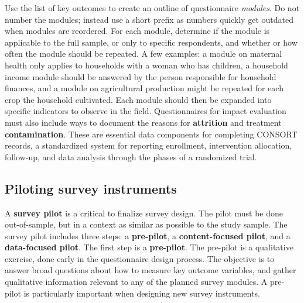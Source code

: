 Use the list of key outcomes to create an outline of questionnaire \textit{modules}.
Do not number the modules; instead use a short prefix
as numbers quickly get outdated when modules are reordered.
For each module, determine if the module is applicable to the full sample,
or only to specific respondents,
and whether or how often the module should be repeated.
A few examples:
a module on maternal health only applies
to households with a woman who has children,
a household income module should be answered
by the person responsible for household finances,
and a module on agricultural production
might be repeated for each crop the household cultivated.
Each module should then be expanded
into specific indicators to observe in the field.
Questionnaires for impact evaluation
must also include ways to document the reasons for \textbf{attrition} and
treatment \textbf{contamination}.
These are essential data components for completing CONSORT records,
a standardized system for reporting enrollment, intervention allocation, follow-up,
and data analysis through the phases of a randomized trial.

\subsection{Piloting survey instruments}
A \textbf{survey pilot}
is a critical to finalize survey design.
The pilot must be done out-of-sample,
but in a context as similar as possible to the study sample.
The survey pilot includes three steps:
a \textbf{pre-pilot}, a \textbf{content-focused pilot}, and a \textbf{data-focused pilot}.
The first step is a \textbf{pre-pilot}.
The pre-pilot is a qualitative exercise, done early in the questionnaire design process.
The objective is to answer broad questions about how to measure key outcome variables,
and gather qualitative information relevant to any of the planned survey modules.
A pre-pilot is particularly important when designing new survey instruments.

